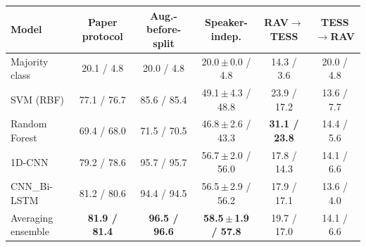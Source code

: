 \begin{tabular}{lccccc}
\toprule
Model & Paper protocol & Aug.-before-split & Speaker-indep. & RAV$\to$TESS & TESS$\to$RAV \\
\midrule
Majority class & 20.1 / 4.8 & 20.0 / 4.8 & 20.0\,$\pm$\,0.0 / 4.8 & 14.3 / 3.6 & 20.0 / 4.8 \\
SVM (RBF) & 77.1 / 76.7 & 85.6 / 85.4 & 49.1\,$\pm$\,4.3 / 48.8 & 23.9 / 17.2 & 13.6 / 7.7 \\
Random Forest & 69.4 / 68.0 & 71.5 / 70.5 & 46.8\,$\pm$\,2.6 / 43.3 & \textbf{31.1 / 23.8} & 14.4 / 5.6 \\
\midrule
1D-CNN & 79.2 / 78.6 & 95.7 / 95.7 & 56.7\,$\pm$\,2.0 / 56.0 & 17.8 / 14.3 & 14.1 / 6.6 \\
CNN\_Bi-LSTM & 81.2 / 80.6 & 94.4 / 94.5 & 56.5\,$\pm$\,2.9 / 56.2 & 17.9 / 17.1 & 13.6 / 4.0 \\
Averaging ensemble & \textbf{81.9 / 81.4} & \textbf{96.5 / 96.6} & \textbf{58.5\,$\pm$\,1.9 / 57.8} & 19.7 / 17.0 & 14.1 / 6.6 \\
\bottomrule
\end{tabular}
